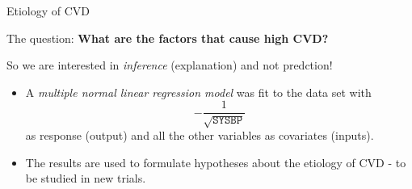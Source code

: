 \documentclass[10pt,ignorenonframetext,]{beamer}
\begin{document}
\begin{frame}

\begin{block}{Etiology of CVD}

\vspace{2mm}

The question: \textbf{What are the factors that cause high CVD?}

\vspace{2mm}

So we are interested in \emph{inference} (explanation) and not
predction!

\vspace{4mm}

\begin{itemize}
\item
  A \emph{multiple normal linear regression model} was fit to the data
  set with \[-\frac{1}{\sqrt{\texttt{SYSBP}}}\] as response (output) and
  all the other variables as covariates (inputs).
\item
  The results are used to formulate hypotheses about the etiology of CVD
  - to be studied in new trials.
\end{itemize}

\end{block}

\end{frame}
\end{document}
